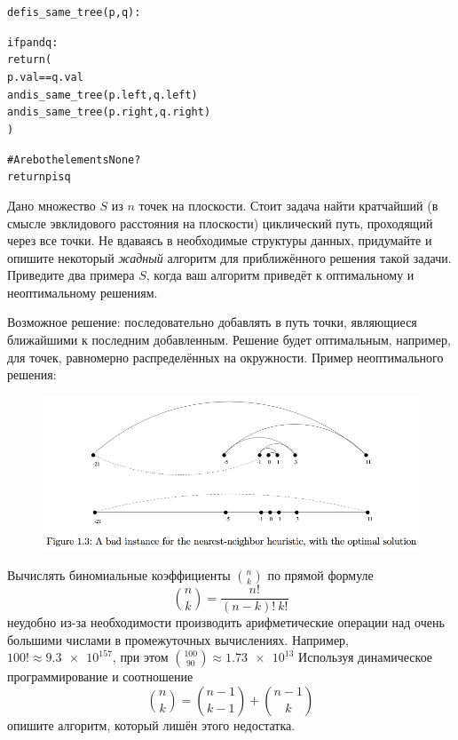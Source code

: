 \documentclass[12pt,answers]{exam}
\begin{document}
\begin{questions}
\begin{solution}
  \begin{alltt}
    def is_same_tree(p, q):
        
        if p and q:
            return (
              p.val == q.val
              and is_same_tree(p.left, q.left)
              and is_same_tree(p.right, q.right)
            )
        
        # Are both elements None?
        return p is q
  \end{alltt}
\end{solution}

\question[3]
Дано множество $S$ из $n$ точек на плоскости. Стоит задача найти кратчайший (в смысле эвклидового расстояния на плоскости) циклический путь, проходящий через все точки. Не вдаваясь в необходимые структуры данных, придумайте и опишите некоторый {\em жадный} алгоритм для приближённого решения такой задачи. Приведите два примера $S$, когда ваш алгоритм приведёт к оптимальному и неоптимальному решениям.

\begin{solution}
Возможное решение: последовательно добавлять в путь точки, являющиеся ближайшими к 
последним добавленным. Решение будет оптимальным, например, для точек, равномерно распределённых на окружности. Пример неоптимального решения:
\begin{figure}[H]
  \includegraphics[width=15cm]{points.png}
\end{figure}
\end{solution}


\question[6]
Вычислять биномиальные коэффициенты $\binom{n}{k}$ по прямой формуле
$$
\binom{n}{k} = \frac{n!}{(n-k)!~k!}
$$
неудобно из-за необходимости производить арифметические операции над очень большими числами в промежуточных вычислениях. Например, $100! \approx \num{9.3e157}$, при этом $\binom{100}{90}\approx \num{1.73e13}$
Используя динамическое программирование и соотношение
$$
\binom{n}{k} = \binom{n-1}{k-1} + \binom{n-1}{k}
$$
опишите алгоритм, который лишён этого недостатка.


\end{questions}
\end{document}
